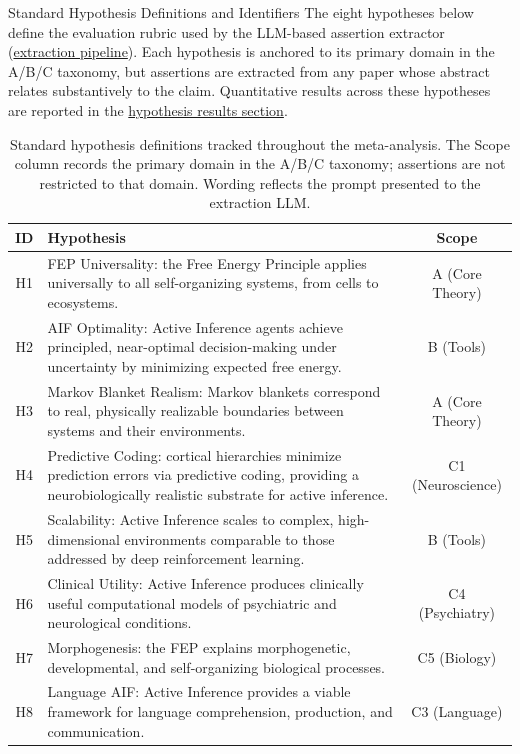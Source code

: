 \documentclass[
  ignorenonframetext,
]{beamer}
\begin{document}
\begin{frame}[allowframebreaks]{Standard Hypothesis Definitions and
Identifiers}
\protect{}\label{standard-hypothesis-definitions-and-identifiers}
The eight hypotheses below define the evaluation rubric used by the
LLM-based assertion extractor
(\hyperref[sec:extraction_pipeline]{extraction pipeline}). Each
hypothesis is anchored to its primary domain in the A/B/C taxonomy, but
assertions are extracted from any paper whose abstract relates
substantively to the claim. Quantitative results across these hypotheses
are reported in the
\hyperref[sec:hypothesis_results]{hypothesis results section}.

\begin{table}[H]
\centering
\caption{Standard hypothesis definitions tracked throughout the meta-analysis. The Scope column records the primary domain in the A/B/C taxonomy; assertions are not restricted to that domain. Wording reflects the prompt presented to the extraction LLM.}
\label{tab:hypothesis_definitions}
\begin{tabular}{cp{8cm}c}
\toprule
\textbf{ID} & \textbf{Hypothesis} & \textbf{Scope} \\
\midrule
H1 & FEP Universality: the Free Energy Principle applies universally to all self-organizing systems, from cells to ecosystems. & A (Core Theory) \\
H2 & AIF Optimality: Active Inference agents achieve principled, near-optimal decision-making under uncertainty by minimizing expected free energy. & B (Tools) \\
H3 & Markov Blanket Realism: Markov blankets correspond to real, physically realizable boundaries between systems and their environments. & A (Core Theory) \\
H4 & Predictive Coding: cortical hierarchies minimize prediction errors via predictive coding, providing a neurobiologically realistic substrate for active inference. & C1 (Neuroscience) \\
H5 & Scalability: Active Inference scales to complex, high-dimensional environments comparable to those addressed by deep reinforcement learning. & B (Tools) \\
H6 & Clinical Utility: Active Inference produces clinically useful computational models of psychiatric and neurological conditions. & C4 (Psychiatry) \\
H7 & Morphogenesis: the FEP explains morphogenetic, developmental, and self-organizing biological processes. & C5 (Biology) \\
H8 & Language AIF: Active Inference provides a viable framework for language comprehension, production, and communication. & C3 (Language) \\
\bottomrule
\end{tabular}
\end{table}

\FloatBarrier
\end{frame}
\end{document}
